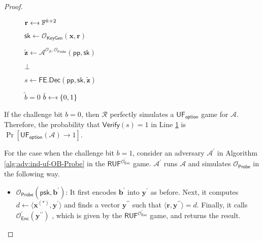 \begin{proof}
\begin{figure}[h]
\begin{minipage}[t]{0.6\linewidth}
\begin{algorithm}[H]
\begin{algorithmic}[1]
		\State $\mathbf{r} \getsdollar \mathbb{F}^{k+2}$

		\State $\textsf{sk} \gets \mathcal{O}_{\textsf{KeyGen}}(\mathbf{x}, \mathbf{r})$

		\State ${\mathbf{\tilde{z}}} \gets \mathcal{A}^{\mathcal{O}_{\mathcal{B}}, \mathcal{O}_{\textsf{Probe}} } ( \textsf{pp}, \textsf{sk})$


			\State \Return $\bot$

		\EndIf

		\State $s \gets \textsf{FE.Dec}( \textsf{pp}, \textsf{sk}, \mathbf{\tilde{z}} )$

		 \label{alg:red:ind-uf-OB-Probe:verify}
			\State \Return $\tilde{b} = 0$
		\Else
			\State \Return $\tilde{b} \getsdollar \{0, 1\}$
		\EndIf

	\end{algorithmic}
	\end{algorithm}
	\end{minipage}
	
\end{figure}

If the challenge bit $b = 0$, then $\mathcal{R}$ perfectly simulates a $\textsf{UF}_\textsf{option}$ game for $\mathcal{A}$. Therefore, the probability that $\textsf{Verify}(s) = 1$ in Line \ref{alg:red:ind-uf-OB-Probe:verify} is $\Pr[\textsf{UF}_\textsf{option}(\mathcal{A}) \to 1]$.

For the case when the challenge bit $b = 1$, consider an adversary $\mathcal{A}^\prime$ in Algorithm \ref{alg:adv:ind-uf-OB-Probe} in the $\textsf{RUF}^{ \mathcal{O}^\prime_{\textsf{Enc}} }$ game. $\mathcal{A}^\prime$ runs $\mathcal{A}$ and simulates $\mathcal{O}_{\textsf{Probe}}$ in the following way.

\begin{itemize}

	\item $\mathcal{O}_{\textsf{Probe}}( \textsf{psk}, \mathbf{b}^\prime )$: It first encodes $\mathbf{b}^\prime$ into $\mathbf{y}^\prime$ as before. Next, it computes $d \gets \langle \mathbf{x}^{(*)}, {\mathbf{y}^\prime} \rangle$ and finds a vector $\mathbf{y}^{\prime\prime}$ such that $\langle \mathbf{r}, {\mathbf{y}^{\prime\prime}} \rangle = d$. Finally, it calls $\mathcal{O}^\prime_{\textsf{Enc}} (\mathbf{y}^{\prime\prime} )$ , which is given by the $\textsf{RUF}^{ \mathcal{O}^\prime_{\textsf{Enc}} }$ game, and returns the result.


\end{itemize}
\end{proof}
